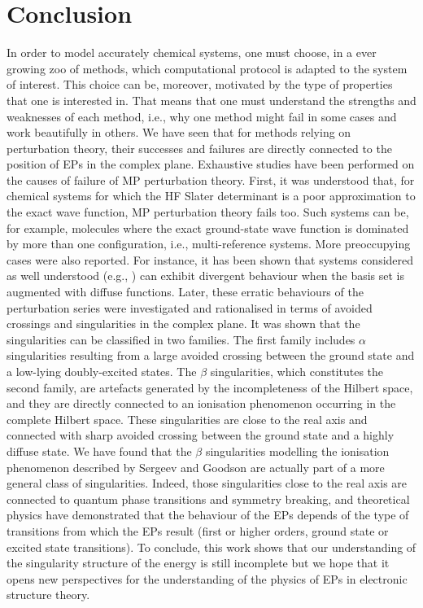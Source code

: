 \documentclass[aps,prb,reprint,noshowkeys,superscriptaddress]{revtex4-1}
\newcommand{\latin}[1]{#1}
\newcommand{\ie}{\latin{i.e.}}
\newcommand{\eg}{\latin{e.g.}}
\begin{document}
\section{Conclusion}

In order to model accurately chemical systems, one must choose, in a ever growing zoo of methods, which computational protocol is adapted to the system of interest.
This choice can be, moreover, motivated by the type of properties that one is interested in.
That means that one must understand the strengths and weaknesses of each method, \ie, why one method might fail in some cases and work beautifully in others. 
We have seen that for methods relying on perturbation theory, their successes and failures are directly connected to the position of EPs in the complex plane. 
Exhaustive studies have been performed on the causes of failure of MP perturbation theory. 
First, it was understood that, for chemical systems for which the HF Slater determinant is a poor approximation to the exact wave function, MP perturbation theory fails too. 
Such systems can be, for example, molecules where the exact ground-state wave function is dominated by more than one configuration, \ie, multi-reference systems. 
More preoccupying cases were also reported. 
For instance, it has been shown that systems considered as well understood (\eg, ) can exhibit divergent behaviour when the basis set is augmented with diffuse functions. 
Later, these erratic behaviours of the perturbation series were investigated and rationalised in terms of avoided crossings and singularities in the complex plane. 
It was shown that the singularities can be classified in two families. 
The first family includes $\alpha$ singularities resulting from a large avoided crossing between the ground state and a low-lying doubly-excited states. 
The $\beta$ singularities, which constitutes the second family, are artefacts generated by the incompleteness of the Hilbert space, and they are directly connected to an ionisation phenomenon occurring in the complete Hilbert space. 
These singularities are close to the real axis and connected with sharp avoided crossing between the ground state and a highly diffuse state. 
We have found that the $\beta$ singularities modelling the ionisation phenomenon described by Sergeev and Goodson are actually part of a more general class of singularities. 
Indeed, those singularities close to the real axis are connected to quantum phase transitions and symmetry breaking, and theoretical physics have demonstrated that the behaviour of the EPs depends of the type of transitions from which the EPs result (first or higher orders, ground state or excited state transitions).
To conclude, this work shows that our understanding of the singularity structure of the energy is still incomplete but we hope that it opens new perspectives for the understanding of the physics of EPs in electronic structure theory.
\end{document}
